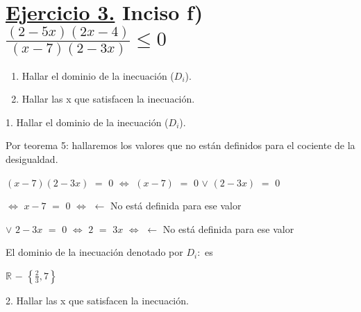 \documentclass[12pt]{article}
\begin{document}
\section{{\textcolor{wildwatermelon}{{\underline{Ejercicio 3.}}}} Inciso {\textcolor{palatinateblue}{f)}} {\LARGE{$\frac{(2-5x) (2x-4)}{(x-7) (2-3x)} \leq 0$ {\red{$^{-}$}}}}} \vspace{0.1cm}

\begin{enumerate}
\item {\textcolor{coolgrey}{Hallar el dominio de la inecuación ($D_i$).}}
\item {\textcolor{coolgrey}{Hallar las x que satisfacen la inecuación.}}
\end{enumerate} \vspace{.6cm}

1. {\textcolor{coolgrey}{Hallar el dominio de la inecuación ($D_i$).}}\vspace{0.5cm}

Por {\textcolor{carrotorange}{teorema 5}}: hallaremos los valores que no están definidos para el cociente de la desigualdad. \vspace{0.5cm}

$(x-7)(2-3x)$ $=$ $0$ $\Longleftrightarrow$ $(x-7)$ $=$ $0$ $\vee$ $(2-3x)$ $=$ $0$\vspace{0.3cm}

$\Longleftrightarrow$ $x-7$ $=$ $0$ $\Longleftrightarrow$  $\longleftarrow$ \hspace{0.1cm} {\footnotesize{No está definida para ese valor}} \vspace{0.3cm}

$\vee$  $2-3x$ $=$ $0$ $\Longleftrightarrow$ $2$ $=$ $3x$ $\Longleftrightarrow$  $\longleftarrow$ \hspace{0.1cm} {\footnotesize{No está definida para ese valor}} \vspace{0.3cm}

El dominio de la inecuación denotado por $D_i:$ es \vspace{0.5cm}

\hspace{4cm} $\mathbb{R}$ $-$ {\LARGE{$\left\{\frac{2}{3}, 7\right\}$}} \vspace{0.5cm} 

\newpage

2. {\textcolor{coolgrey}{Hallar las x que satisfacen la inecuación.}}

\vspace{0.5cm}
\end{document}

